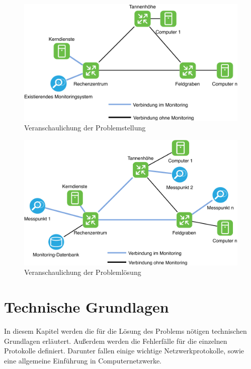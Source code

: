 \documentclass[titlepage]{report}
\begin{document}
\begin{figure}[H]
    \centering
    \includegraphics[width=1.0\textwidth]{figures/problemstellung.pdf}
    \caption{Veranschaulichung der Problemstellung}\label{fig:problemstellung}
\end{figure}
\begin{figure}[H]
    \centering
    \includegraphics[width=1.0\textwidth]{figures/problemloesung.pdf}
    \caption{Veranschaulichung der Problemlösung}\label{fig:problemloesung}
\end{figure}
\chapter*{Technische Grundlagen}
In diesem Kapitel werden die für die Lösung des Problems nötigen
technischen Grundlagen erläutert. Außerdem werden die Fehlerfälle für
die einzelnen Protokolle definiert. Darunter fallen einige wichtige
Netzwerkprotokolle, sowie eine allgemeine Einführung in
Computernetzwerke.
\end{document}
